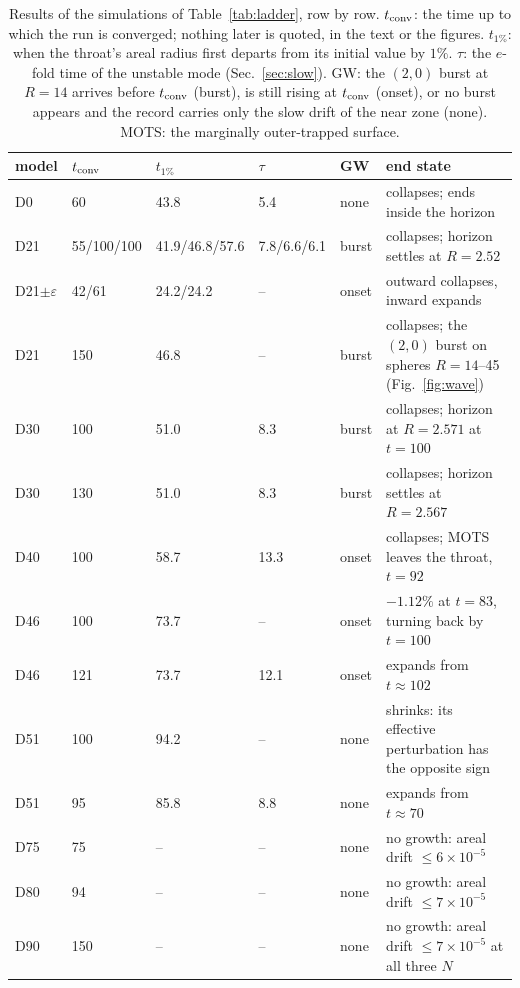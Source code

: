 \documentclass[twocolumn,floatfix,aps,prd,superscriptaddress,nofootinbib]{revtex4-2}
\begin{document}
\begin{table}[t]
\caption{Results of the simulations of Table~\ref{tab:ladder}, row by row. $t_{\rm conv}$: the time up to which the run is converged; nothing later is quoted, in the text or the figures. $t_{1\%}$: when the throat's areal radius first departs from its initial value by $1\%$. $\tau$: the $e$-fold time of the unstable mode (Sec.~\ref{sec:slow}). GW: the $(2,0)$ burst at $R=14$ arrives before $t_{\rm conv}$ (burst), is still rising at $t_{\rm conv}$ (onset), or no burst appears and the record carries only the slow drift of the near zone (none). MOTS: the marginally outer-trapped surface.}
\label{tab:results}
\scriptsize
\setlength{\tabcolsep}{3pt}
\begin{ruledtabular}
\begin{tabular}{lllllp{}}
model & $t_{\rm conv}$ & $t_{1\%}$ & $\tau$ & GW & end state \\
\hline
D0 & 60 & 43.8 & 5.4 & none & collapses; ends inside the horizon \\
D21 & 55/100/100 & 41.9/46.8/57.6 & 7.8/6.6/6.1 & burst & collapses; horizon settles at $R=2.52$ \\
D21$\pm\varepsilon$ & 42/61 & 24.2/24.2 & -- & onset & outward collapses, inward expands \\
D21 & 150 & 46.8 & -- & burst & collapses; the $(2,0)$ burst on spheres $R=14$--45 (Fig.~\ref{fig:wave}) \\
D30 & 100 & 51.0 & 8.3 & burst & collapses; horizon at $R=2.571$ at $t=100$ \\
D30 & 130 & 51.0 & 8.3 & burst & collapses; horizon settles at $R=2.567$ \\
D40 & 100 & 58.7 & 13.3 & onset & collapses; MOTS leaves the throat, $t=92$ \\
D46 & 100 & 73.7 & -- & onset & $-1.12\%$ at $t=83$, turning back by $t=100$ \\
D46 & 121 & 73.7 & 12.1 & onset & expands from $t\approx102$ \\
D51 & 100 & 94.2 & -- & none & shrinks: its effective perturbation has the opposite sign \\
D51 & 95 & 85.8 & 8.8 & none & expands from $t\approx70$ \\
D75 & 75 & -- & -- & none & no growth: areal drift $\le6\times10^{-5}$ \\
D80 & 94 & -- & -- & none & no growth: areal drift $\le7\times10^{-5}$ \\
D90 & 150 & -- & -- & none & no growth: areal drift $\le7\times10^{-5}$ at all three $N$ \\
\end{tabular}
\end{ruledtabular}
\end{table}
\end{document}
